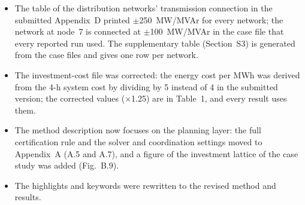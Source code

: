 \documentclass[11pt]{article}
\begin{document}
\begin{itemize}[leftmargin=*]
  \item The table of the distribution networks' transmission connection in the submitted Appendix~D printed $\pm$250~MW/MVAr for every network; the network at node~7 is connected at $\pm$100~MW/MVAr in the case file that every reported run used. The supplementary table (Section~S3) is generated from the case files and gives one row per network.
  \item The investment-cost file was corrected: the energy cost per MWh was derived from the 4-h system cost by dividing by 5 instead of 4 in the submitted version; the corrected values (×1.25) are in Table~1, and every result uses them.
  \item The method description now focuses on the planning layer: the full certification rule and the solver and coordination settings moved to Appendix~A (A.5 and A.7), and a figure of the investment lattice of the case study was added (Fig.~B.9).
  \item The highlights and keywords were rewritten to the revised method and results.
\end{itemize}
\end{document}
